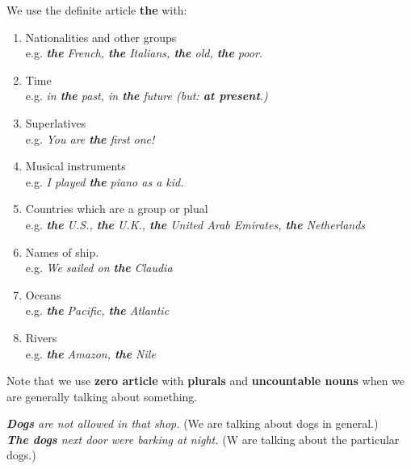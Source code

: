 \documentclass[10pt,a4paper]{article}
\begin{document}
We use the definite article \textbf{the} with:
\begin{enumerate}[label=\alph*)]
\item Nationalities and other groups\\
		e.g. \textit{ \textbf{the} French, \textbf{the} Italians, \textbf{the} old, \textbf{the} poor.}
\item Time\\
		e.g. \textit{in \textbf{the} past, in \textbf{the} future (but: \textbf{at present}.)}
\item Superlatives\\
		e.g. \textit{You are \textbf{the} first one!}
\item Musical instruments\\
		e.g. \textit{I played \textbf{the} piano as a kid.}
\item Countries which are a group or plual\\
		e.g. \textit{ \textbf{the} U.S., \textbf{the} U.K., \textbf{the} United Arab Emirates, \textbf{the} Netherlands }
\item Names of ship.\\
		e.g. \textit{We sailed on \textbf{the} Claudia}
\item Oceans\\
		e.g. \textit{ \textbf{the} Pacific, \textbf{the} Atlantic}
\item Rivers\\
		e.g. \textit{ \textbf{the} Amazon, \textbf{the} Nile}
\end{enumerate}

Note that we use \textbf{zero article} with \textbf{plurals} and \textbf{uncountable nouns} when we are generally talking about something.
\begin{center}
		\textit{ \textbf{Dogs} are not allowed in that shop.} (We are talking about dogs in general.)\\
		\textit{ \textbf{The dogs} next door were barking at night.} (W are talking about the particular dogs.)
\end{center}
\end{document}
